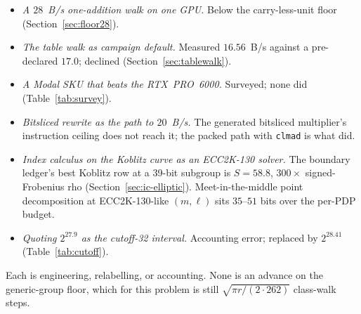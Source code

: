 \begin{itemize}[leftmargin=1.2em,itemsep=0.4em]
\item \emph{A $28$~B/s one-addition walk on one GPU.} Below the
  carry-less-unit floor (Section~\ref{sec:floor28}).
\item \emph{The table walk as campaign default.} Measured $16.56$~B/s
  against a pre-declared $17.0$; declined
  (Section~\ref{sec:tablewalk}).
\item \emph{A Modal SKU that beats the RTX~PRO~6000.} Surveyed; none
  did (Table~\ref{tab:survey}).
\item \emph{Bitsliced rewrite as the path to $20$~B/s.} The generated
  bitsliced multiplier's instruction ceiling does not reach it; the
  packed path with \texttt{clmad} is what did.
\item \emph{Index calculus on the Koblitz curve as an ECC2K-130
  solver.} The boundary ledger's best Koblitz row at a 39-bit
  subgroup is $S=58.8$, $300\times$ signed-Frobenius rho
  (Section~\ref{sec:ic-elliptic}). Meet-in-the-middle point
  decomposition at ECC2K-130-like $(m,\ell)$ sits $35$--$51$ bits over
  the per-PDP budget.
\item \emph{Quoting $2^{27.9}$ as the cutoff-32 interval.} Accounting
  error; replaced by $2^{28.41}$ (Table~\ref{tab:cutoff}).
\end{itemize}

Each is engineering, relabelling, or accounting. None is an advance on
the generic-group floor, which for this problem is still $\sqrt{\pi
r/(2\cdot 262)}$ class-walk steps.
